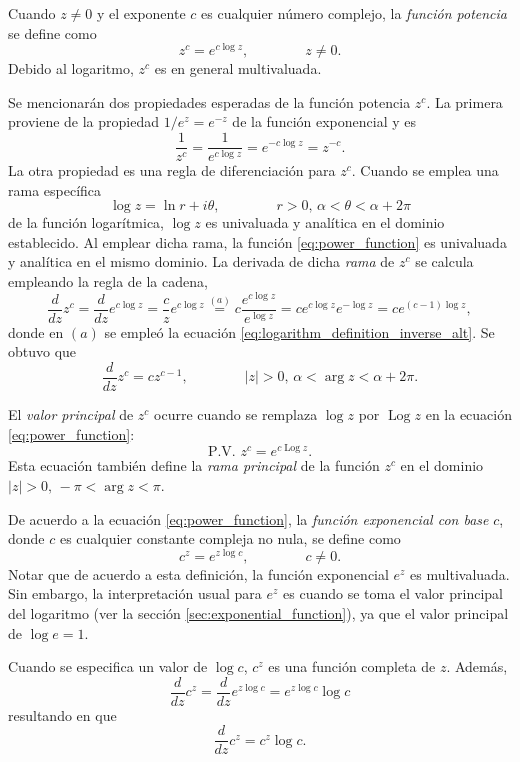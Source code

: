 \documentclass[a4paper]{report}
\DeclareMathOperator{\Log}{Log}
\begin{document}
Cuando \(z\neq0\) y el exponente \(c\) es cualquier número complejo, la \emph{función potencia} se define como 
\begin{equation}\label{eq:power_function}
 z^c=e^{c\log z},
 \qquad\qquad 
 z\neq0. 
\end{equation}
Debido al logaritmo, \(z^c\) es en general multivaluada.

Se mencionarán dos propiedades esperadas de la función potencia \(z^c\). La primera proviene de la propiedad \(1/e^z=e^{-z}\) de la función exponencial y es
\[
 \frac{1}{z^c}=\frac{1}{e^{c\log z}}=e^{-c\log z}=z^{-c}.
\]
La otra propiedad es una regla de diferenciación para \(z^c\). Cuando se emplea una rama específica
\[
 \log z=\ln r+i\theta,\qquad\qquad
 r>0,\,\alpha<\theta<\alpha+2\pi
\]
de la función logarítmica, \(\log z\) es univaluada y analítica en el dominio establecido. Al emplear dicha rama, la función \ref{eq:power_function} es univaluada y analítica en el mismo dominio. La derivada de dicha \emph{rama} de \(z^c\) se calcula empleando la regla de la cadena,
\[
 \frac{d}{dz}z^c=\frac{d}{dz}e^{c\log z}=\frac{c}{z}e^{c\log z}\overset{(a)}{=}c\frac{e^{c\log z}}{e^{\log z}}=ce^{c\log z}e^{-\log z}=ce^{(c-1)\log z},
\]
donde en \((a)\) se empleó la ecuación \ref{eq:logarithm_definition_inverse_alt}. Se obtuvo que 
\[
 \frac{d}{dz}z^c=cz^{c-1},
 \qquad\qquad
 |z|>0,\,\alpha<\arg z<\alpha+2\pi.
\]

El \emph{valor principal} de \(z^c\) ocurre cuando se remplaza \(\log z\) por \(\Log z\) en la ecuación \ref{eq:power_function}:
\begin{equation}\label{eq:power_function_pv}
 \textrm{P.V. }z^c=e^{c\Log z}. 
\end{equation}
Esta ecuación también define la \emph{rama principal} de la función \(z^c\) en el dominio \(|z|>0,\,-\pi<\arg z<\pi\). 

De acuerdo a la ecuación \ref{eq:power_function}, la \emph{función exponencial con base} \(c\), donde \(c\) es cualquier constante compleja no nula, se define como
\[
 c^z=e^{z\log c},
 \qquad\qquad 
 c\neq0. 
\]
Notar que de acuerdo a esta definición, la función exponencial \(e^z\) es multivaluada. Sin embargo, la interpretación usual para \(e^z\) es cuando se toma el valor principal del logaritmo (ver la sección \ref{sec:exponential_function}), ya que el valor principal de \(\log e=1\).

Cuando se especifica un valor de \(\log c\), \(c^z\) es una función completa de \(z\). Además,
\[
 \frac{d}{dz}c^z=\frac{d}{dz}e^{z\log c}=e^{z\log c}\log c
\]
resultando en que 
\begin{equation}\label{eq:power_constant_derivative}
 \frac{d}{dz}c^z=c^z\log c. 
\end{equation}
\end{document}
